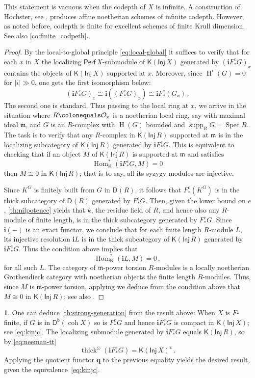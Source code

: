 \documentclass{amsart}
\newcommand{\dcat}[2][]{\cat{D}_{#1}(#2)}
\newcommand{\kinj}[1]{\cat{K}(\cat{Inj}\,#1)}
\newcommand{\perf}[1]{\mathsf{Perf}\,#1}
\newcommand{\coh}{\operatorname{coh}}
\newcommand{\dbcat}[1]{\cat{D}^{\mathsf{b}}(#1)}
\newcommand{\mco}{\mathcal{O}}
\newcommand{\fm}{\mathfrak{m}}
\newcommand{\sfc}{\mathsf{c}}
\newcommand{\bfi}{\boldsymbol{i}}
\newcommand{\cat}[1]{{\mathsf{#1}}}
\newcommand{\hh}{\operatorname{H}}
\newcommand{\Hom}{\operatorname{Hom}}
\newcommand{\spec}{\operatorname{Spec}}
\newcommand{\supp}{\operatorname{supp}}
\newcommand{\thick}{\operatorname{thick}}
\theoremstyle{definition}
\newtheorem{chunk}[subsection]{}
\theoremstyle{remark}
\numberwithin{equation}{subsection}
\begin{document}
This statement is vacuous when the codepth of $X$ is infinite. A construction of Hochster, see \cite[Proposition~1]{Hochster:1973}, produces affine noetherian schemes of infinite codepth. However, as noted before, codepth is finite for excellent schemes of finite Krull dimension. See also \cref{co:finite_codpeth}.

\begin{proof}
By the local-to-global principle \cref{eq:local-global} it suffices to verify that for each $x$ in $X$ the localizing $\perf X$-submodule of $\kinj X$ generated by $(\bfi F ^e_*G)_x$ contains the objects of $\kinj X$ supported at $x$. Moreover, since $\hh^i(G)=0$ for $|i|\gg 0$, one gets the first isomorphism below: 
\[
(\bfi F ^e_*G)_x \cong \bfi((F ^e_*G)_x)\cong \bfi F ^e_*(G_x)\,.
\]
The second one is standard. Thus passing to the local ring at $x$, we arrive in the situation where $R\colonequals \mco_x$ is a noetherian local ring, say with maximal ideal $\fm$, and $G$ is an $R$-complex with $\hh(G)$ bounded and $\supp_RG=\spec R$. The task is to verify that any $R$-complex in $\kinj R$ supported at $\fm$ is in the localizing subcategory of $\kinj R$ generated by $\bfi F ^e_*G$. This is equivalent to checking that if an object $M$ of $\kinj R$ is supported at $\fm$ and satisfies
\[
\Hom_{\cat K}^*(\bfi  F ^e_*G , M)=0
\]
then $M\cong 0$ in $\kinj R$; that is to say, all its syzygy modules are injective. 

Since $K^G$ is finitely built from $G$ in $\dcat R$, it follows that $F ^e_*(K^G)$ is in the thick subcategory of $\dcat R$ generated by $F ^e_*G$. Then, given the lower bound on $e$, \cref{th:nilpotence} yields that $k$, the residue field of $R$, and hence also any $R$-module of finite length, is in the thick subcategory generated by $F ^e_*G$. Since $\bfi(-)$ is an exact functor, we conclude that for each finite length $R$-module $L$, its injective resolution $\bfi L$ is in the thick subcategory of $\kinj R$ generated by $\bfi F ^e_*G$. Thus the condition above implies that
\[
\Hom_{\cat K}^*(\bfi L, M)=0\,,
\]
for all such $L$. The category of $\fm$-power torsion $R$-modules is a locally noetherian Grothendieck category with noetherian objects the finite length $R$-modules. Thus, since $M$ is $\fm$-power torsion, applying \cite[Lemma~2.2]{Krause:2005} we deduce from the condition above that $M\cong 0$ in $\kinj R$; see also \cite[Lemma~6.4.11]{Krause:2022}.
\end{proof}

\begin{chunk}
\label{ch:kinj-remark}
One can deduce \cref{th:strong-generation} from the result above: When $X$ is $F $-finite, if $G$ is in $\dbcat{\coh X}$ so is $F ^e_*G$ and hence $\bfi F ^e_*G$ is compact in $\kinj X$; see \cref{eq:kinjc}. The localizing submodule generated by $\bfi F ^e_*G$ equals $\kinj R$, so by \cref{eq:neeman-tt}
\[
\thick^{\odot}(\bfi F ^e_*G ) = {\kinj X}^{\sfc}\,.
\]
Applying the quotient functor $\boldsymbol{q}$ to the previous equality yields the desired result, given the equivalence~\cref{eq:kinjc}.
\end{chunk}
\end{document}
